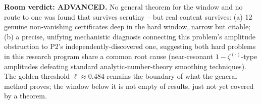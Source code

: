 \documentclass[11pt]{article}
\begin{document}
\textbf{Room verdict: ADVANCED.} No general theorem for the window and no route to one was found
that survives scrutiny -- but real content survives: (a) 12 genuine non-vanishing certificates
deep in the hard window, narrow but citable; (b) a precise, unifying mechanistic diagnosis
connecting this problem's amplitude obstruction to P2's independently-discovered one, suggesting
both hard problems in this research program share a common root cause (near-resonant
$1-\zeta^{(\cdot)}$-type amplitudes defeating standard analytic-number-theory smoothing
techniques). The golden threshold $\ell\approx0.484$ remains the boundary of what the general
method proves; the window below it is not empty of results, just not yet covered by a theorem.
\end{document}
